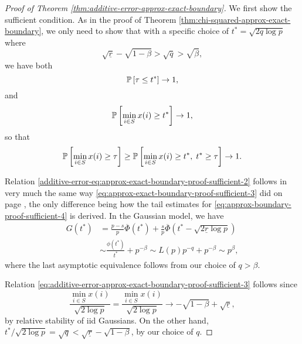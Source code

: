 \begin{proof}[Proof of Theorem \ref{thm:additive-error-approx-exact-boundary}]
We first show the sufficient condition.
As in the proof of Theorem \ref{thm:chi-squared-approx-exact-boundary}, we only need to show that with a specific choice of $t^*=\sqrt{2q\log{p}}$ where
\begin{equation} \label{eq:additive-error-approx-exact-boundary-proof-sufficient-1}
\sqrt{\underline{r}}-\sqrt{1-\beta}>\sqrt{q}>\sqrt{\beta},
\end{equation}
we have both
\begin{equation} \label{additive-error-eq:approx-exact-boundary-proof-sufficient-2}
\P\left[\tau\le t^*\right]\to 1,
\end{equation}
and 
\begin{equation} \label{eq:additive-error-approx-exact-boundary-proof-sufficient-3}
    \P\left[\min_{i\in S}x(i) \ge t^* \right] \to 1,
\end{equation}
so that 
\begin{equation*} 
    \P\left[\min_{i\in S}x(i) \ge \tau\right] \ge 
    \P\left[\min_{i\in S}x(i) \ge t^*,\; t^* \ge \tau\right] \to 1.
\end{equation*}

Relation \eqref{additive-error-eq:approx-exact-boundary-proof-sufficient-2} follows in very much the same way \eqref{eq:approx-exact-boundary-proof-sufficient-3} did on page \pageref{eq:approx-exact-boundary-proof-sufficient-3}, the only difference being how the tail estimates for \eqref{eq:approx-boundary-proof-sufficient-4} is derived.
In the Gaussian model, we have
\begin{align*}
    G(t^*) 
    &= \frac{p-s}{p}\overline{\Phi}(t^*) + \frac{s}{p}\overline{\Phi}(t^*-\sqrt{2\underline{r}\log{p}}) \\
    &\sim \frac{\phi(t^*)}{t^*} + p^{-\beta} 
    \sim L(p)p^{-q} + p^{-\beta} \sim p^{\beta},
\end{align*}
where the last asymptotic equivalence follows from our choice of $q>\beta$.

Relation \eqref{eq:additive-error-approx-exact-boundary-proof-sufficient-3} follows since 
$$
\frac{\min_{i\in S}x(i)}{\sqrt{2\log{p}}} 
= \frac{\min_{i\in S}x(i)}{\sqrt{2\log{p}}} 
\to -\sqrt{1-\beta} + \sqrt{\underline{r}},
$$
by relative stability of iid Gaussians. On the other hand, ${t^*}/{\sqrt{2\log{p}}}=\sqrt{q}<\sqrt{\underline{r}}-\sqrt{1-\beta}$, by our choice of ${q}$.


\end{proof}
